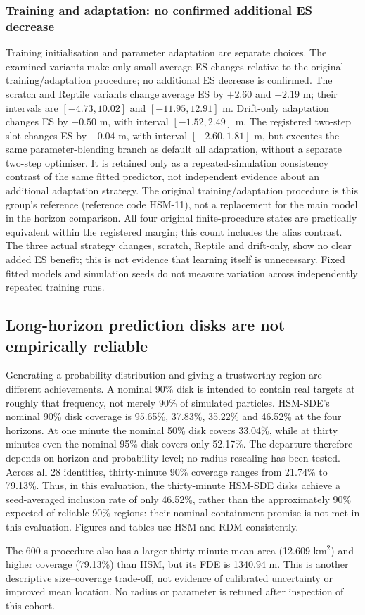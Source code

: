 \subsubsection{Training and adaptation: no confirmed additional ES decrease}
Training initialisation and parameter adaptation are separate choices.
The examined variants make only small average ES changes relative to the
original training/adaptation procedure; no additional ES decrease is confirmed.
The scratch and Reptile variants change average ES by $+2.60$ and $+2.19$ m;
their intervals are $[-4.73,10.02]$ and $[-11.95,12.91]$ m. Drift-only adaptation
changes ES by $+0.50$ m, with interval $[-1.52,2.49]$ m. The registered
two-step slot changes ES by $-0.04$ m, with interval $[-2.60,1.81]$ m,
but executes the same parameter-blending branch as default all adaptation,
without a separate two-step optimiser. It is retained only as a repeated-simulation
consistency contrast of the same fitted predictor, not independent evidence
about an additional adaptation strategy. The original training/adaptation
procedure is this group's reference (reference code HSM-11),
not a replacement for the main model in the horizon comparison. All four
original finite-procedure states are practically equivalent within the
registered margin; this count includes the alias contrast. The three actual
strategy changes, scratch, Reptile and drift-only, show no clear added ES
benefit; this is not evidence that learning itself
is unnecessary. Fixed fitted models and simulation seeds do not measure
variation across independently repeated training runs.

\subsection{Long-horizon prediction disks are not empirically reliable}\label{sec:region-reliability}
Generating a probability distribution and giving a trustworthy region are
different achievements. A nominal 90\% disk is intended to contain real
targets at roughly that frequency, not merely 90\% of simulated particles.
HSM-SDE's nominal 90\% disk coverage is 95.65\%, 37.83\%, 35.22\% and 46.52\%
at the four horizons. At one minute the nominal 50\% disk covers 33.04\%,
while at thirty minutes even the nominal 95\% disk covers only 52.17\%.
The departure therefore depends on horizon and probability level; no
radius rescaling has been tested. Across all 28 identities, thirty-minute
90\% coverage ranges from 21.74\% to 79.13\%. Thus, in this evaluation,
the thirty-minute HSM-SDE disks achieve a seed-averaged inclusion rate of
only 46.52\%, rather than the approximately 90\% expected of reliable
90\% regions: their nominal containment promise is not met in this evaluation.
Figures and tables use HSM and RDM consistently.

The 600 s procedure also has a larger thirty-minute mean area
(12.609 km$^2$) and higher coverage (79.13\%) than HSM, but its FDE is
1340.94 m. This is another descriptive size--coverage trade-off, not
evidence of calibrated uncertainty or improved mean location. No radius
or parameter is retuned after inspection of this cohort.


